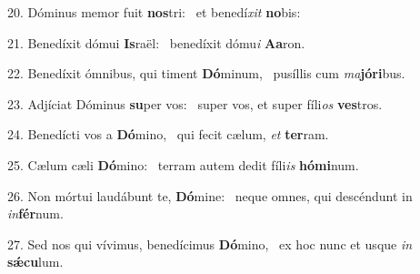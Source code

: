 20. Dóminus memor fuit \textbf{nos}tri: \ast\  et benedí\textit{xit} \textbf{no}bis:\

21. Benedíxit dómui \textbf{Is}raël: \ast\  benedíxit dómu\textit{i} \textbf{A}\textbf{a}ron.\

22. Benedíxit ómnibus, qui timent \textbf{Dó}minum, \ast\  pusíllis cum \textit{ma}\textbf{jó}\textbf{ri}bus.\

23. Adjíciat Dóminus \textbf{su}per vos: \ast\  super vos, et super fíli\textit{os} \textbf{ves}tros.\

24. Benedícti vos a \textbf{Dó}mino, \ast\  qui fecit cælum, \textit{et} \textbf{ter}ram.\

25. Cælum cæli \textbf{Dó}mino: \ast\  terram autem dedit fíli\textit{is} \textbf{hó}\textbf{mi}num.\

26. Non mórtui laudábunt te, \textbf{Dó}mine: \ast\  neque omnes, qui descéndunt in \textit{in}\textbf{fér}num.\

27. Sed nos qui vívimus, benedícimus \textbf{Dó}mino, \ast\  ex hoc nunc et usque \textit{in} \textbf{sǽ}\textbf{cu}lum.\

